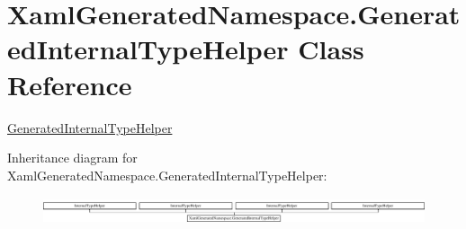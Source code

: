\hypertarget{class_xaml_generated_namespace_1_1_generated_internal_type_helper}{}\section{Xaml\+Generated\+Namespace.\+Generated\+Internal\+Type\+Helper Class Reference}
\label{class_xaml_generated_namespace_1_1_generated_internal_type_helper}


\hyperlink{class_xaml_generated_namespace_1_1_generated_internal_type_helper}{Generated\+Internal\+Type\+Helper}  


Inheritance diagram for Xaml\+Generated\+Namespace.\+Generated\+Internal\+Type\+Helper\+:\begin{figure}[H]
\begin{center}
\leavevmode
\includegraphics[height=0.813953cm]{class_xaml_generated_namespace_1_1_generated_internal_type_helper}
\end{center}
\end{figure}
